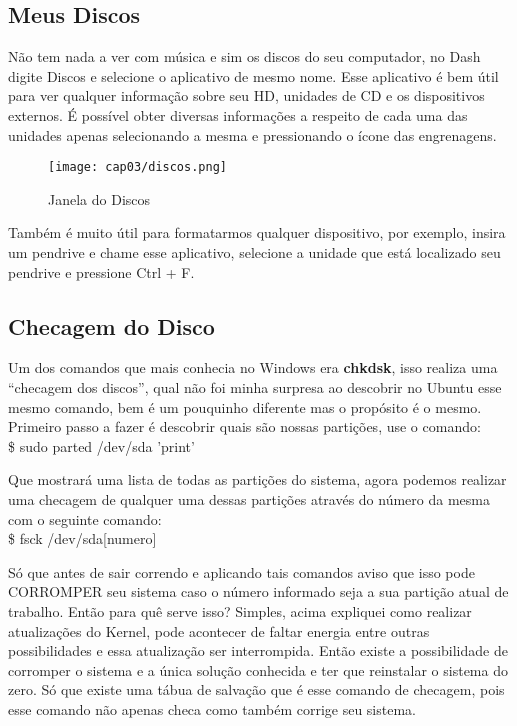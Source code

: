 \subsection{Meus Discos}
Não tem nada a ver com música e sim os discos do seu computador, no Dash digite Discos e selecione o aplicativo de mesmo nome. Esse aplicativo é bem útil para ver qualquer informação sobre seu HD, unidades de CD e os dispositivos externos. É possível obter diversas informações a respeito de cada uma das unidades apenas selecionando a mesma e pressionando o ícone das engrenagens.
\begin{figure}[H]
\centering\texttt{[image: cap03/discos.png]}
\caption{Janela do Discos}
\end{figure}

Também é muito útil para formatarmos qualquer dispositivo, por exemplo, insira um pendrive e chame esse aplicativo, selecione a unidade que está localizado seu pendrive e pressione Ctrl + F.

\subsection{Checagem do Disco}
Um dos comandos que mais conhecia no Windows era \textbf{chkdsk}, isso realiza uma ``checagem dos discos'', qual não foi minha surpresa ao descobrir no Ubuntu esse mesmo comando, bem é um pouquinho diferente mas o propósito é o mesmo. Primeiro passo a fazer é descobrir quais são nossas partições, use o comando: \\
{\ttfamily\$ sudo parted /dev/sda 'print'}

Que mostrará uma lista de todas as partições do sistema, agora podemos realizar uma checagem de qualquer uma dessas partições através do número da mesma com o seguinte comando: \\
{\ttfamily\$ fsck /dev/sda[numero]}

Só que antes de sair correndo e aplicando tais comandos aviso que isso pode CORROMPER seu sistema caso o número informado seja a sua partição atual de trabalho. Então para quê serve isso? Simples, acima expliquei como realizar atualizações do Kernel, pode acontecer de faltar energia entre outras possibilidades e essa atualização ser interrompida. Então existe a possibilidade de corromper o sistema e a única solução conhecida e ter que reinstalar o sistema do zero. Só que existe uma tábua de salvação que é esse comando de checagem, pois esse comando não apenas checa como também corrige seu sistema.

